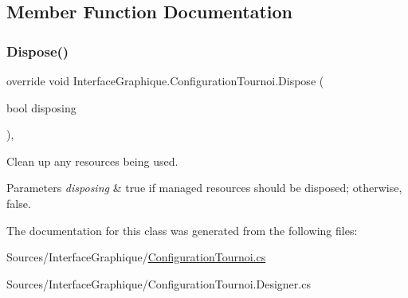\subsection{Member Function Documentation}
\hypertarget{class_interface_graphique_1_1_configuration_tournoi_ad801e75807538977aa896ae679e403ec}{}\label{class_interface_graphique_1_1_configuration_tournoi_ad801e75807538977aa896ae679e403ec} 
\subsubsection{\texorpdfstring{Dispose()}{Dispose()}}
{\footnotesize\ttfamily override void Interface\+Graphique.\+Configuration\+Tournoi.\+Dispose (\begin{DoxyParamCaption}\item[{bool}]{disposing }\end{DoxyParamCaption})\hspace{0.3cm}{\ttfamily [inline]}, {\ttfamily [protected]}}



Clean up any resources being used. 


\begin{DoxyParams}{Parameters}
{\em disposing} & true if managed resources should be disposed; otherwise, false.\\
\hline
\end{DoxyParams}


The documentation for this class was generated from the following files\+:\begin{DoxyCompactItemize}
\item 
Sources/\+Interface\+Graphique/\hyperlink{_configuration_tournoi_8cs}{Configuration\+Tournoi.\+cs}\item 
Sources/\+Interface\+Graphique/Configuration\+Tournoi.\+Designer.\+cs\end{DoxyCompactItemize}
